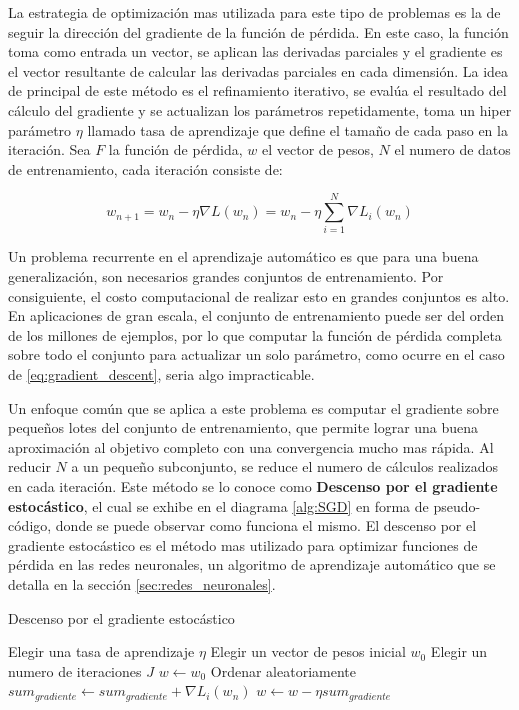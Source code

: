 \documentclass[a4paper,11pt,spanish]{book}
\begin{document}
      La estrategia de optimización mas utilizada para este tipo de problemas es la de seguir la dirección del gradiente de la función de pérdida.
      En este caso, la función toma como entrada un vector, se aplican las derivadas parciales y el gradiente es el vector resultante de calcular las derivadas parciales
      en cada dimensión.
      La idea de principal de este método es el refinamiento iterativo, se evalúa el resultado del cálculo del gradiente y se actualizan los parámetros repetidamente,
      toma un hiper parámetro $\eta$ llamado tasa de aprendizaje que define el tamaño de cada paso en la iteración.
      Sea $F$ la función de pérdida, $w$ el vector de pesos, $N$ el numero de datos de entrenamiento, cada iteración consiste de:

      \begin{equation}\label{eq:gradient_descent}
	w_{n+1} = w_n - \eta \nabla L(w_n)  = w_n - \eta \sum_{i=1}^{N} \nabla L_i(w_n)
      \end{equation}

      Un problema recurrente en el aprendizaje automático es que para una buena generalización, son necesarios grandes conjuntos de entrenamiento.
      Por consiguiente, el costo computacional de realizar esto en grandes conjuntos es alto.
      En aplicaciones de gran escala, el conjunto de entrenamiento puede ser del orden de los millones de ejemplos, por lo que computar la función de
      pérdida completa sobre todo el conjunto para actualizar un solo parámetro, como ocurre en el caso de \eqref{eq:gradient_descent}, seria algo impracticable.
      
      Un enfoque común que se aplica a este problema es computar el gradiente sobre pequeños lotes del conjunto de entrenamiento, que permite lograr una buena aproximación 
      al objetivo completo con una convergencia mucho mas rápida. 
      Al reducir $N$ a un pequeño subconjunto, se reduce el numero de cálculos realizados en cada iteración. 
      Este método se lo conoce como \textbf{Descenso por el gradiente estocástico}, el cual se exhibe en el diagrama \ref{alg:SGD} en forma de pseudo-código, 
      donde se puede observar como funciona el mismo. 
      El descenso por el gradiente estocástico es el método mas utilizado para optimizar funciones de pérdida en las redes neuronales, un algoritmo de aprendizaje
      automático que se detalla en la sección \ref{sec:redes_neuronales}.

	\begin{algorithm}[ht]
	  \caption{Descenso por el gradiente estocástico}
	  \label{alg:SGD}
	  \begin{algorithmic}
	    \State Elegir una tasa de aprendizaje $\eta$
	    \State Elegir un vector de pesos inicial $w_0$
	    \State Elegir un numero de iteraciones $J$
	    \State $w \gets w_0$
	      \State Ordenar aleatoriamente
		$sum_{gradiente} \gets sum_{gradiente} + \nabla L_i(w_n)$
		$w \gets w - \eta sum_{gradiente}$
	      \EndFor
	    \EndFor
	  \end{algorithmic}
	\end{algorithm}
\end{document}
